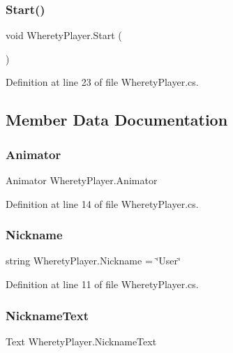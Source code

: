 \subsubsection{\texorpdfstring{Start()}{Start()}}
{\footnotesize\ttfamily void Wherety\+Player.\+Start (\begin{DoxyParamCaption}{ }\end{DoxyParamCaption})}



Definition at line 23 of file Wherety\+Player.\+cs.



\subsection{Member Data Documentation}
\mbox{\label{class_wherety_player_a06753b2e604bebeda7523f009f5259ca}} 
\subsubsection{\texorpdfstring{Animator}{Animator}}
{\footnotesize\ttfamily Animator Wherety\+Player.\+Animator}



Definition at line 14 of file Wherety\+Player.\+cs.

\mbox{\label{class_wherety_player_a4b69223c4cecc70a0d2e26da921cf7b4}} 
\subsubsection{\texorpdfstring{Nickname}{Nickname}}
{\footnotesize\ttfamily string Wherety\+Player.\+Nickname = \char`\"{}User\char`\"{}}



Definition at line 11 of file Wherety\+Player.\+cs.

\mbox{\label{class_wherety_player_aeddcaa682986588d775b22ec44c35aa9}} 
\subsubsection{\texorpdfstring{NicknameText}{NicknameText}}
{\footnotesize\ttfamily Text Wherety\+Player.\+Nickname\+Text}



